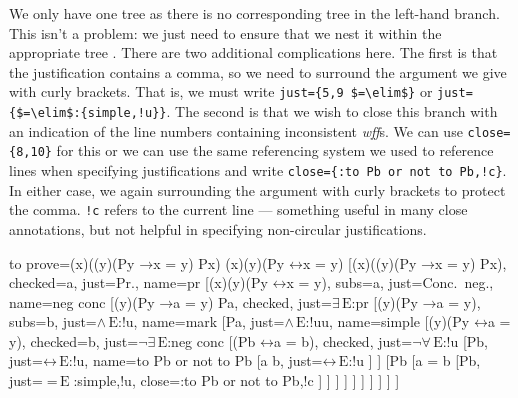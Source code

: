 \documentclass[10pt,british,a4paper]{ltxdoc}
\newcommand*{\lif}{\ensuremath{\mathbin{\rightarrow}}}
\newcommand*{\liff}{\ensuremath{\mathbin{\leftrightarrow}}}
\newcommand*{\elim}{\,\text{E}}
\newcommand*\wff{\emph{wff}}
\begin{document}
We only have one tree \nyth*{} as there is no corresponding tree in the left-hand branch.
This isn't a problem: we just need to ensure that we nest it within the appropriate tree \nyth[9].
There are two additional complications here.
The first is that the justification contains a comma, so we need to surround the argument we give  with curly brackets.
That is, we must write \verb|just={5,9 $=\elim$}| or \verb|just={$=\elim$:{simple,!u}}|.
The second is that we wish to close this branch with an indication of the line numbers containing inconsistent \wff{}s.
We can use \verb|close={8,10}| for this or we can use the same referencing system we used to reference lines when specifying justifications and write \verb|close={:to Pb or not to Pb,!c}|.
In either case, we again surrounding the argument with curly brackets to protect the comma.
\verb|!c| refers to the current line --- something useful in many close annotations, but not helpful in specifying non-circular justifications.
\begin{latexcode}
\begin{prooftree}
  {
    to prove={(\exists x)((\forall y)(Py \lif x = y) \land Px) \sststile{}{} (\exists x)(\forall y)(Py \liff x = y)}
  }
  [{(\exists x)((\forall y)(Py \lif x = y) \land Px)}, checked=a, just=Pr., name=pr
    [{\lnot (\exists x)(\forall y)(Py \liff x = y)}, subs=a, just=Conc.~neg., name=neg conc
      [{(\forall y)(Py \lif a = y) \land Pa}, checked, just=$\exists\elim$:pr
        [{(\forall y)(Py \lif a = y)}, subs=b, just=$\land\elim$:!u, name=mark
          [Pa, just=$\land\elim$:!uu, name=simple
            [{\lnot (\forall y)(Py \liff a = y)}, checked=b, just=$\lnot\exists\elim$:neg conc
              [{\lnot (Pb \liff a = b)}, checked, just=$\lnot\forall\elim$:!u
                [Pb, just=$\liff\elim$:!u, name=to Pb or not to Pb
                 [a \neq b, just=$\liff\elim$:!u
                 ]
                ]
                [\lnot Pb
                 [{a = b}
                    [Pb, just={$=\elim$:{simple,!u}}, close={:to Pb or not to Pb,!c}
                    ]
                 ]
                ]
              ]
            ]
          ]
        ]
      ]
    ]
  ]
\end{prooftree}
\end{latexcode}
\end{document}
